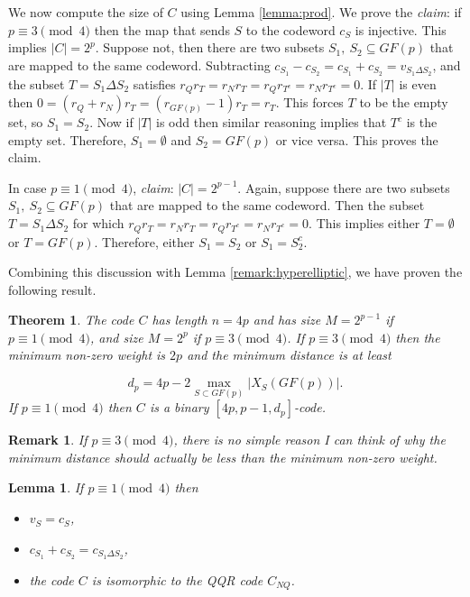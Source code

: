 \documentclass[submission%
]{dmtcs}
\newtheorem{lemma}{Lemma}
\newtheorem{theorem}{Theorem}
\newtheorem{remark}{Remark}
\begin{document}
We now compute the size of $C$ using Lemma \ref{lemma:prod}. 
We prove the \textit{claim}:
if $p\equiv 3\pmod4$ then the map that sends $S$ to the codeword
$c_S$ is injective. 
This implies $|C|=2^p$.  Suppose not, then there are two subsets
$S_1,\ S_2\subseteq GF(p)$ that are mapped to the same codeword.
Subtracting $c_{S_1}-c_{S_2}=c_{S_1}+c_{S_2}=v_{S_1\Delta S_2}$, and
the subset $T=S_1\Delta S_2$ satisfies
$r_Q r_T=r_N r_T=r_Q r_{T^c}=r_N r_{T^c}=0$. If $|T|$ is even then
$0=(r_Q + r_N)r_T=(r_{GF(p)}-1)r_T=r_T$.  This forces $T$ to be
the empty set, so $S_1=S_2$.  Now if $|T|$ is odd then similar
reasoning implies that $T^c$ is the empty set.  Therefore,
$S_1=\emptyset$ and $S_2=GF(p)$ or vice versa.  This proves the claim.

In case $p\equiv 1\pmod4$, \textit{claim}: $|C|=2^{p-1}$.
Again, suppose there are two subsets
$S_1,\ S_2\subseteq GF(p)$ that are mapped to the same codeword.
Then the  subset $T=S_1\Delta S_2$ for which
$r_Q r_T=r_N r_T=r_Q r_{T^c}=r_N r_{T^c}=0$. This implies
either $T=\emptyset$ or $T=GF(p)$. Therefore, either
$S_1=S_2$ or $S_1=S_2^c$.

Combining this discussion with Lemma \ref{remark:hyperelliptic},
we have proven the following result.

\begin{theorem}
\label{thrm:1}
The code $C$ has length $n=4p$ and has size $M=2^{p-1}$
if $p\equiv 1\pmod 4$,
and size $M=2^p$ if $p\equiv 3\pmod 4$.
If $p\equiv 3\pmod 4$ then the minimum non-zero weight is $2p$
and the minimum distance is at least

\[
d_p=4p-2\max_{S\subset GF(p)} |X_S(GF(p))|.
\]
If $p\equiv 1\pmod 4$ then $C$ is a binary
$[4p,p-1,d_p]$-code.
\end{theorem}

\begin{remark}
If $p\equiv 3\pmod 4$, there is no simple reason I can think of 
why the minimum distance should actually be less than the minimum non-zero 
weight.
\end{remark}


\begin{lemma}
If $p\equiv 1\pmod 4$ then 

\begin{itemize}
\item
$v_S=c_S$, 

\item
$c_{S_1}+c_{S_2}=c_{S_1\Delta S_2}$,
\item
the code $C$ is isomorphic to the QQR code $C_{NQ}$.

\end{itemize}
\end{lemma}
\end{document}
